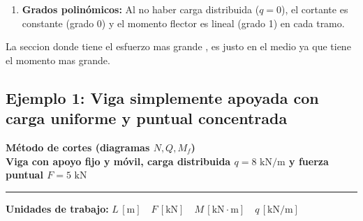 {\begin{enumerate}
\begin{itemize}
                        \[

                            \Delta Q = Q(2^+) - Q(2^-) = -5 - (+5) = -10\text{ kN} = -F

                        \]

                  \item Al no existir momentos puntuales aplicados, la ley de $M_f(x)$ es continua en $x = 2\text{ m}$ ($M_f(2) = 10\text{ kN}\cdot\text{m}$), con un punto anguloso debido al salto de cortante.

              \end{itemize}

        \item \textbf{Grados polinómicos:} Al no haber carga distribuida ($q = 0$), el cortante es constante (grado 0) y el momento flector es lineal (grado 1) en cada tramo.

    \end{enumerate}

}




La seccion donde tiene el esfuerzo mas grande , es justo en el medio ya que tiene el momento mas grande.





\subsection{Ejemplo 1: Viga simplemente apoyada con carga uniforme y puntual concentrada}



\begin{tcolorbox}[colback=blue!3!white, colframe=blue!40!black, arc=3pt, boxrule=0.8pt, left=8pt, right=8pt, top=6pt, bottom=6pt]

    \centering

    {\Large\bfseries\color{blue!60!black} Método de cortes (diagramas $N, Q, M_f$)}\\[2pt]

    {\normalsize\bfseries Viga con apoyo fijo y móvil, carga distribuida $q = 8\text{ kN/m}$ y fuerza puntual $F = 5\text{ kN}$}



    \vspace{4pt}\hrule\vspace{4pt}

    {\small\textbf{Unidades de trabajo:} $L\,[\text{m}] \quad F\,[\text{kN}] \quad M\,[\text{kN}\cdot\text{m}] \quad q\,[\text{kN/m}]$}

\end{tcolorbox}



